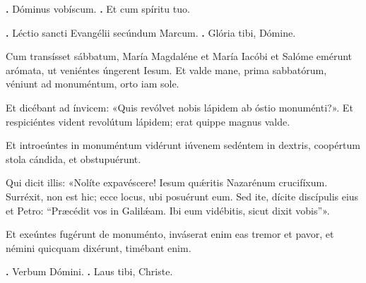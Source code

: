 
\textbf{\Vbar.} Dóminus vobíscum.
\textbf{\Rbar.} Et cum spíritu tuo.

\textbf{\Vbar.} Léctio sancti Evangélii secúndum Marcum.
\textbf{\Rbar.} Glória tibi, Dómine.

Cum transísset sábbatum, María Magdaléne et María Iacóbi et Salóme emérunt arómata, ut veniéntes úngerent Iesum.
Et valde mane, prima sabbatórum, véniunt ad monuméntum, orto iam sole.

Et dicébant ad ínvicem: «Quis revólvet nobis lápidem ab óstio monuménti?».
Et respiciéntes vident revolútum lápidem; erat quippe magnus valde.

Et introeúntes in monuméntum vidérunt iúvenem sedéntem in dextris, coopértum stola cándida, et obstupuérunt.

Qui dicit illis: «Nolíte expavéscere! Iesum qu\'{\ae}ritis Nazarénum crucifíxum.
Surréxit, non est hic; ecce locus, ubi posuérunt eum.
Sed ite, dícite discípulis eius et Petro: “Præcédit vos in Galil\'{\ae}am.
Ibi eum vidébitis, sicut dixit vobis”».

Et exeúntes fugérunt de monuménto, inváserat enim
eas tremor et pavor, et némini quicquam dixérunt, timébant enim.

\textbf{\Vbar.} Verbum Dómini.
\textbf{\Rbar.} Laus tibi, Christe.
\par